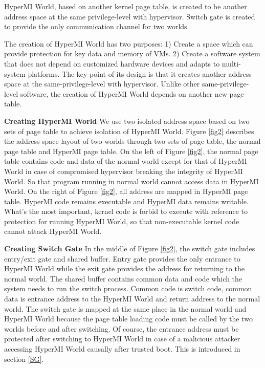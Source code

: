 \documentclass[conference]{IEEEtran}
\begin{document}
HyperMI World, based on another kernel page table, is created to be another address space at the same privilege-level with hypervisor. %
Switch gate is created to provide the only communication channel for two worlds.

The creation of HyperMI World has two purposes: 1) Create a space which can provide protection for key data and memory of VMs. 2) Create a software system that does not depend on customized hardware devices and adapts to multi-system platforms. The key point of its design is that it creates another address space at the same-privilege-level with hypervisor. Unlike other same-privilege-level software, the creation of HyperMI World depends on another new page table.

\textbf{Creating HyperMI World}
 We use two isolated address space based on two sets of page table to achieve isolation of HyperMI World.
Figure \ref{fig2} describes the address space layout of two worlds through two sets of page table, the normal page table and HyperMI page table. On the left of Figure \ref{fig2}, the normal page table contains code and data of the normal world except for that of HyperMI World in case of compromised hypervisor breaking the integrity of HyperMI World. So that program running in normal world cannot access data in HyperMI World. On the right of Figure \ref{fig2}, all address are mapped in HyperMI page table.
HyperMI code remains executable and HyperMI data remains writable. What's the most important, kernel code is forbid to execute with reference to protection for running HyperMI World, so that non-executable kernel code  cannot attack HyperMI World.

\textbf{Creating Switch Gate}
In the middle of Figure \ref{fig2}, the switch gate includes entry/exit gate and shared buffer. Entry gate provides the only entrance to HyperMI World while the exit gate provides the address for returning to the normal world. The shared buffer contains common data and code which the system needs to run the switch process. Common code is switch code, common data is entrance address to the HyperMI World and return address to the normal world. The switch gate is mapped at the same place in the normal world and HyperMI World because the page table loading code must be called by the two worlds before and after switching. Of course, the entrance address must be protected after switching to HyperMI World in case of a malicious attacker accessing HyperMI World causally after trusted boot. This is introduced in section \ref{SG}.
\end{document}
